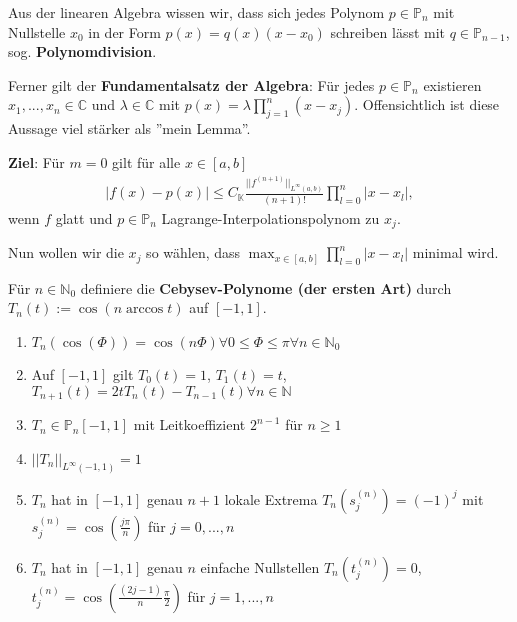 \begin{remark}
	Aus der linearen Algebra wissen wir, dass sich jedes Polynom $p \in \mathbb{P}_n$ mit Nullstelle $x_0$ in der Form $p(x) = q(x)(x-x_0)$ schreiben lässt mit $q \in \mathbb{P}_{n-1}$, sog. \textbf{Polynomdivision}.
\end{remark}

Ferner gilt der \textbf{Fundamentalsatz der Algebra}: Für jedes $p \in \mathbb{P}_n$ existieren $x_1, ..., x_n \in \mathbb{C}$ und $\lambda \in \mathbb{C}$ mit $p(x) = \lambda \prod_{j=1}^{n}(x-x_j)$. Offensichtlich ist diese Aussage viel stärker als ''mein Lemma''.

\textbf{Ziel}: Für $m=0$ gilt für alle $x \in [a,b]$
\begin{align*}
	|f(x)-p(x)| \leq C_{\mathbb{K}} \frac{||f^{(n+1)}||_{L^\infty(a,b)}}{(n+1)!} \prod_{l=0}^{n} |x-x_l|,
\end{align*}
wenn $f$ glatt und $p \in \mathbb{P}_n$ Lagrange-Interpolationspolynom zu $x_j$.

Nun wollen wir die $x_j$ so wählen, dass $\max_{x\in [a,b]} \prod_{l=0}^{n} |x-x_l|$ minimal wird.

\begin{definition}
	Für $n \in \mathbb{N}_0$ definiere die \textbf{Cebysev-Polynome (der ersten Art)} durch $T_n(t) := \cos(n \arccos t)$ auf $[-1, 1]$.
\end{definition}

\begin{lemma}
	\begin{enumerate}
		\item $T_n(\cos(\Phi)) = \cos(n \Phi) \forall 0 \leq \Phi \leq \pi \forall n \in \mathbb{N}_0$
		\item Auf $[-1, 1]$ gilt $T_0(t) = 1$, $T_1(t) = t$, $T_{n+1}(t) = 2t T_n(t) - T_{n-1}(t) \forall n \in \mathbb{N}$
		\item $T_n \in \mathbb{P}_n[-1, 1]$ mit Leitkoeffizient $2^{n-1}$ für $n \geq 1$
		\item $||T_n||_{L^\infty(-1, 1)} = 1$
		\item $T_n$ hat in $[-1, 1]$ genau $n+1$ lokale Extrema $T_n(s_j^{(n)}) = (-1)^j$ mit $s_j^{(n)} = \cos \left(\frac{j\pi}{n}\right)$ für $j=0, ..., n$
		\item $T_n$ hat in $[-1, 1]$ genau $n$ einfache Nullstellen $T_n(t_j^{(n)}) = 0$, $t_j^{(n)} = \cos \left(\frac{(2j-1)}{n}\frac{\pi}{2} \right)$ für $j=1, ..., n$
	\end{enumerate}
\end{lemma}


